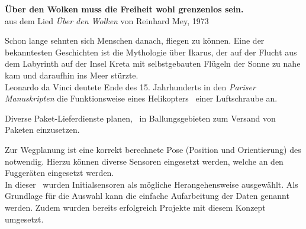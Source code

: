 

\vspace{1cm}
\begin{center}
\textbf{\grqq Über den Wolken muss die Freiheit wohl grenzenlos sein.\grqq}\\
\vspace{0.5cm}
aus dem Lied \textit{Über den Wolken} von Reinhard Mey, 1973 \cite{Einl1}
\end{center}
\vspace{1cm}


Schon lange sehnten sich Menschen danach, fliegen zu können. Eine der bekanntesten Geschichten ist die Mythologie über Ikarus, der auf der Flucht aus dem Labyrinth auf der Insel Kreta mit selbstgebauten Flügeln der Sonne zu nahe kam und daraufhin ins Meer stürzte. \\
Leonardo da Vinci deutete Ende des 15. Jahrhunderts in den \textit{Pariser Manuskripten} die Funktionsweise eines Helikopters \bzw\ einer Luftschraube an. 

Diverse Paket-Lieferdienste planen, \Quad\ in Ballungsgebieten zum Versand von Paketen einzusetzen. 

Zur Wegplanung ist eine korrekt berechnete Pose (Position und Orientierung) des \Quad[s] notwendig. Hierzu können diverse Sensoren eingesetzt werden, welche an den Fuggeräten eingesetzt werden.\\
In dieser \Arbeit\ wurden Initialsensoren als mögliche Herangehensweise ausgewählt. Als Grundlage für die Auswahl kann die einfache Aufarbeitung der Daten genannt werden. Zudem wurden bereits erfolgreich Projekte mit diesem Konzept umgesetzt. 






\vspace{5cm}







